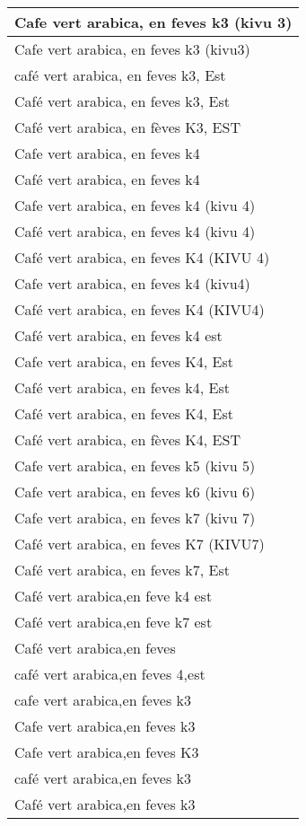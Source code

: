 \documentclass[
]{book}
\begin{document}
\begin{table}
\begin{tabular}[t]{l}
\hline
Cafe vert arabica, en feves k3 (kivu 3)\\
\hline
Cafe vert arabica, en feves k3 (kivu3)\\
\hline
café vert arabica, en feves k3, Est\\
\hline
Café vert arabica, en feves k3, Est\\
\hline
Café vert arabica, en fèves K3, EST\\
\hline
Cafe vert arabica, en feves k4\\
\hline
Café vert arabica, en feves k4\\
\hline
Cafe vert arabica, en feves k4 (kivu 4)\\
\hline
Café vert arabica, en feves k4 (kivu 4)\\
\hline
Café vert arabica, en feves K4 (KIVU 4)\\
\hline
Cafe vert arabica, en feves k4 (kivu4)\\
\hline
Café vert arabica, en feves K4 (KIVU4)\\
\hline
Café vert arabica, en feves k4 est\\
\hline
Cafe vert arabica, en feves K4, Est\\
\hline
Café vert arabica, en feves k4, Est\\
\hline
Café vert arabica, en feves K4, Est\\
\hline
Café vert arabica, en fèves K4, EST\\
\hline
Cafe vert arabica, en feves k5 (kivu 5)\\
\hline
Cafe vert arabica, en feves k6 (kivu 6)\\
\hline
Cafe vert arabica, en feves k7 (kivu 7)\\
\hline
Café vert arabica, en feves K7 (KIVU7)\\
\hline
Café vert arabica, en feves k7, Est\\
\hline
Café vert arabica,en feve k4 est\\
\hline
Café vert arabica,en feve k7 est\\
\hline
Café vert arabica,en feves\\
\hline
café vert arabica,en feves 4,est\\
\hline
cafe vert arabica,en feves k3\\
\hline
Cafe vert arabica,en feves k3\\
\hline
Cafe vert arabica,en feves K3\\
\hline
café vert arabica,en feves k3\\
\hline
Café vert arabica,en feves k3\\

\end{tabular}
\end{table}
\end{document}
